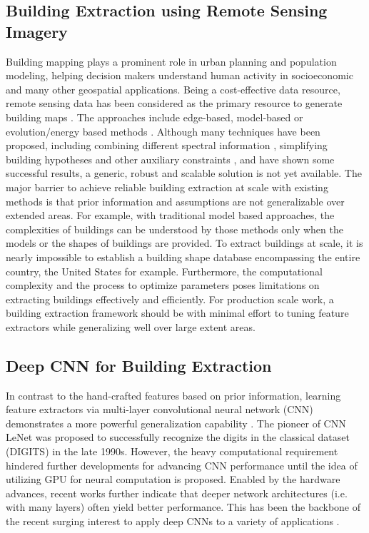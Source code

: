 \documentclass[journal]{IEEEtran}
\begin{document}
\subsection{Building Extraction using Remote Sensing Imagery}
Building mapping plays a prominent role in urban planning and population modeling, helping decision makers understand human activity in socioeconomic \cite{Jensen1999} and many other geospatial applications. Being a cost-effective data resource, remote sensing data has been considered as the primary resource to generate building maps \cite{Ok2013a,Ngo2017,Li2015,Kim1999,Hermosilla2011,Cote2013}. The approaches include edge-based, model-based \cite{Ngo2017} or evolution/energy based methods \cite{Cote2013}. Although many techniques have been proposed, including combining different spectral information \cite{Ok2013a}, simplifying building hypotheses \cite{Kim1999} and other auxiliary constraints \cite{Ngo2017}, and have shown some successful results, a generic, robust and scalable solution is not yet available. The major barrier to achieve reliable building extraction at scale with existing methods is that prior information and assumptions are not generalizable over extended areas. For example, with traditional model based approaches, the complexities of buildings can be understood by those methods only when the models or the shapes of buildings are provided. To extract buildings at scale, it is nearly impossible to establish a building shape database encompassing the entire country, the United States for example. Furthermore, the computational complexity and the process to optimize parameters poses limitations on extracting buildings effectively and efficiently. For production scale work, a building extraction framework should be with minimal effort to tuning feature extractors while generalizing well over large extent areas.

\subsection{Deep CNN for Building Extraction}
In contrast to the hand-crafted features based on prior information, learning feature extractors via multi-layer convolutional neural network (CNN) demonstrates a more powerful generalization capability  \cite{Goodfellow2016}. The pioneer of CNN LeNet \cite{LeCunBottouBengioEtAl1998} was proposed to successfully recognize the digits in the classical dataset (DIGITS) in the late 1990s. However, the heavy computational requirement hindered further developments for advancing CNN performance until the idea of utilizing GPU for neural computation is proposed. Enabled by the hardware advances, recent works further indicate that deeper network architectures (i.e. with many layers) often yield better performance. This has been the backbone of the recent surging interest to apply deep CNNs to a variety of applications \cite{SimonyanZisserman2015,SzegedyLiuJiaEtAl2015,KarpathyTodericiShettyEtAl2014,OquabBottouLaptevEtAl2014,SainathKingsburySaonEtAl2015}.
\end{document}
